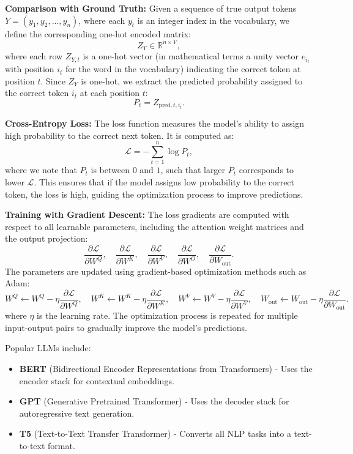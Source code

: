 {\bf Comparison with Ground Truth:} Given a sequence of true output tokens \( Y = (y_1, y_2, ..., y_n) \), where each \( y_t \) is an integer index in the vocabulary, we define the corresponding one-hot encoded matrix:
\[
Z_Y \in \mathbb{R}^{n \times V}, 
\]
where each row \( Z_{Y,t} \) is a one-hot vector (in mathematical terms a unity vector $e_{i_t}$ with position $i_t$ for the word in the vocabulary) indicating the correct token at position \( t \). Since \( Z_Y \) is one-hot, we extract the predicted probability assigned to the correct token \( i_t \) at each position \( t \):
\[
P_t = Z_{\text{pred}, t, i_t}.
\]

%
{\bf Cross-Entropy Loss:} The loss function measures the model’s ability to assign high probability to the correct next token. It is computed as:
\[
\mathcal{L} = - \sum_{t=1}^{n} \log P_t, 
\]
where we note that $P_t$ is between $0$ and $1$, such that larger $P_t$ corresponds to lower $\mathcal{L}$. This ensures that if the model assigns low probability to the correct token, the loss is high, guiding the optimization process to improve predictions.

{\bf Training with Gradient Descent:} The loss gradients are computed with respect to all learnable parameters, including the attention weight matrices and the output projection:
\[
\frac{\partial \mathcal{L}}{\partial W^Q}, \quad \frac{\partial \mathcal{L}}{\partial W^K}, \quad \frac{\partial \mathcal{L}}{\partial W^V}, \quad \frac{\partial \mathcal{L}}{\partial W^O}, \quad \frac{\partial \mathcal{L}}{\partial W_{\text{out}}}.
\]
The parameters are updated using gradient-based optimization methods such as Adam:
\[
W^Q \leftarrow W^Q - \eta \frac{\partial \mathcal{L}}{\partial W^Q}, \quad W^K \leftarrow W^K - \eta \frac{\partial \mathcal{L}}{\partial W^K}, \quad W^V \leftarrow W^V - \eta \frac{\partial \mathcal{L}}{\partial W^V}, \quad W_{\text{out}} \leftarrow W_{\text{out}} - \eta \frac{\partial \mathcal{L}}{\partial W_{\text{out}}}.
\]
where \( \eta \) is the learning rate. The optimization process is repeated for multiple input-output pairs to gradually improve the model's predictions. 

%
Popular LLMs include:
\begin{itemize}
    \item \textbf{BERT} (Bidirectional Encoder Representations from Transformers) - Uses the encoder stack for contextual embeddings.
    \item \textbf{GPT} (Generative Pretrained Transformer) - Uses the decoder stack for autoregressive text generation.
    \item \textbf{T5} (Text-to-Text Transfer Transformer) - Converts all NLP tasks into a text-to-text format.
\end{itemize}

